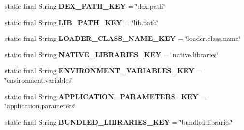 \begin{DoxyCompactItemize}
static final String {\bfseries D\+E\+X\+\_\+\+P\+A\+T\+H\+\_\+\+K\+EY} = \char`\"{}dex.\+path\char`\"{}
\item 
\mbox{\label{classorg_1_1qtproject_1_1qt5_1_1android_1_1bindings_1_1_qt_loader_a6d4eb99d7b6dd01c657a72f78ecf9f10}} 
static final String {\bfseries L\+I\+B\+\_\+\+P\+A\+T\+H\+\_\+\+K\+EY} = \char`\"{}lib.\+path\char`\"{}
\item 
\mbox{\label{classorg_1_1qtproject_1_1qt5_1_1android_1_1bindings_1_1_qt_loader_a45d922ba69469af53eb6c0f09c102654}} 
static final String {\bfseries L\+O\+A\+D\+E\+R\+\_\+\+C\+L\+A\+S\+S\+\_\+\+N\+A\+M\+E\+\_\+\+K\+EY} = \char`\"{}loader.\+class.\+name\char`\"{}
\item 
\mbox{\label{classorg_1_1qtproject_1_1qt5_1_1android_1_1bindings_1_1_qt_loader_a9d3afc1d0f362c9caf98e6ae324f9ca5}} 
static final String {\bfseries N\+A\+T\+I\+V\+E\+\_\+\+L\+I\+B\+R\+A\+R\+I\+E\+S\+\_\+\+K\+EY} = \char`\"{}native.\+libraries\char`\"{}
\item 
\mbox{\label{classorg_1_1qtproject_1_1qt5_1_1android_1_1bindings_1_1_qt_loader_a73d817e37d67a2a083d38763b5b66692}} 
static final String {\bfseries E\+N\+V\+I\+R\+O\+N\+M\+E\+N\+T\+\_\+\+V\+A\+R\+I\+A\+B\+L\+E\+S\+\_\+\+K\+EY} = \char`\"{}environment.\+variables\char`\"{}
\item 
\mbox{\label{classorg_1_1qtproject_1_1qt5_1_1android_1_1bindings_1_1_qt_loader_a4e6b9ea55ce0d771a71677fb1f958163}} 
static final String {\bfseries A\+P\+P\+L\+I\+C\+A\+T\+I\+O\+N\+\_\+\+P\+A\+R\+A\+M\+E\+T\+E\+R\+S\+\_\+\+K\+EY} = \char`\"{}application.\+parameters\char`\"{}
\item 
\mbox{\label{classorg_1_1qtproject_1_1qt5_1_1android_1_1bindings_1_1_qt_loader_a63457d9db60682895ab04c5463700e26}} 
static final String {\bfseries B\+U\+N\+D\+L\+E\+D\+\_\+\+L\+I\+B\+R\+A\+R\+I\+E\+S\+\_\+\+K\+EY} = \char`\"{}bundled.\+libraries\char`\"{}

\end{DoxyCompactItemize}
